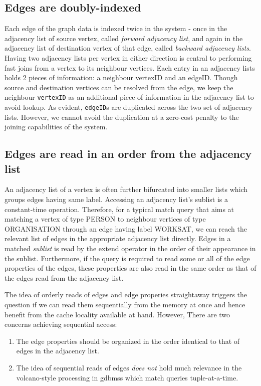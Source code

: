 
\subsection{Edges are doubly-indexed}
Each edge of the graph data is indexed twice in the system - once in the adjacency list of source vertex, called \emph{forward adjacency list}, and again in the adjacency list of destination vertex of that edge, called \emph{backward adjacency lists}. Having two adjacency lists per vertex in either direction is central to performing fast joins from a vertex to its neighbour vertices. Each entry in an adjacency lists holds 2 pieces of information: a neighbour vertexID and an edgeID. Though source and destination vertices can be resolved from the edge, we keep the neighbour \texttt{vertexID} as an additional piece of information in the adjacency list to avoid lookup. As evident, \texttt{edgeID}s are duplicated across the two set of adjacency lists. However, we cannot avoid the duplication at a zero-cost penalty to the joining capabilities of the system.

\subsection{Edges are read in an order from the adjacency list}
An adjacency list of a vertex is often further bifurcated into smaller lists which groups edges having same label. Accessing an adjacency list's sublist is a constant-time operation. Therefore, for a typical match query that aims at matching a vertex of type PERSON to neighbour vertices of type ORGANISATION through an edge having label WORKSAT, we can reach the relevant list of edges in the appropriate adjacency list directly. Edges in a matched \emph{sublist} is read by the extend operator in the order of their appearance in the sublist. Furthermore, if the query is required to read some or all of the edge properties of the edges, these properties are also read in the same order as that of the edges read from the adjacency list. 

The idea of orderly reads of edges and edge properies straightaway triggers the question if we can read them sequentially from the memory at once and hence benefit from the cache locality available at hand. However, There are two concerns achieving sequential access: 
\begin{enumerate}
	\item The edge properties should be organized in the order identical to that of edges in the adjacency list.
	\item The idea of sequential reads of edges \emph{does not} hold much relevance in the volcano-style processing in \gls{gdbms}s which match queries tuple-at-a-time.
\end{enumerate}

